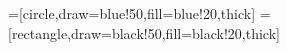 \documentclass[%
    corpo=12pt,
    twoside,
    oldstyle,
    autoretitolo,
    greek,
    evenboxes,
]{toptesi}
\begin{document}
\begin{comment}

\section{Ricerca e classificazione delle attestazioni SOA}
\begin{enumerate}
\item identifico una finestra di testo di mio interesse; 
\item all'interno della finestra ricerco istanze delle singole categorie e classifiche;
\item per ogni categoria c individuata, effettuo la normalizzazione normalised\_category(c),
   per cui di quella categoria verrà preso il nome standard;
   ad esempio normalised\_category(\say{og1})  e  normalised\_category(\say{OG 1}) restituiranno entrambe il valore normalizzato \say{OG-1};
\item effettuo un filtraggio sulle categorie finora ottenute:
   se, ad esempio, la regex ammette una categoria come \say{OS-99}, questa non fa parte della lista di categorie SOA "conosciute"   e viene dunque rigettata;
\item effettuo una normalizzazione delle classifiche economiche;
\item concateno categoria SOA e classifica economica trovata; dunque ho a disposizione l'attestazione per intero;
\item per ogni "finestra" di testo, raccolgo le attestazioni individuate e relativi offset (start\_offset, end\_offset) interni al documento;
\item Scrivo l'ouput in un apposito file csv. Per ogni finestra di testo,
   stampo istanze SOA individuate e relative coppie (start\_offset, end\_offset).
\end{enumerate}
L'output di questo prototipo-regex mostra delle limitazioni e dei casi tipici di errore:
in alcune istanze testuali può capitare che una categoria sia menzionata con un nome leggermente diverso da quello canonico (ad es. \say{OS-18}, laddove le alternative accettabili sono \say{OS-18A} e \say{OS-18B}).
In questi casi il filtering, la normalizzazione e anche le regex possono essere leggermente modificate per riconoscere come accettabili tali valori testuali; però modifiche ripetute alle regex possono portare le stesse a diventare incomprensibili e ad essere error-prone.
\end{comment}
=[circle,draw=blue!50,fill=blue!20,thick]
=[rectangle,draw=black!50,fill=black!20,thick]
\end{document}
